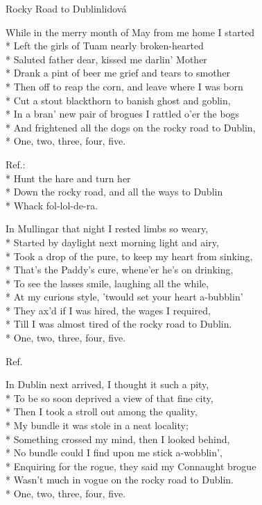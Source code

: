 \documentclass[10.5pt]{book}
\begin{document}
\iffalse
\begin{poem}{Rocky Road to Dublin}{lidová}

\settowidth{\versewidth}{And I have frightened all the dogs on the rocky road
to Dublin,}

While in the merry month of May from me home I started\\*
Left the girls of Tuam nearly broken-hearted\\*
Saluted father dear, kissed me darlin' Mother\\*
Drank a pint of beer me grief and tears to smother\\*
Then off to reap the corn, and leave where I was born\\*
Cut a stout blackthorn to banish ghost and goblin,\\*
In a bran' new pair of brogues I rattled o'er the bogs\\*
And frightened all the dogs on the rocky road to Dublin,\\*
One, two, three, four, five. 

Ref.:\\*
Hunt the hare and turn her\\*
Down the rocky road, and all the ways to Dublin\\*
Whack fol-lol-de-ra.

In Mullingar that night I rested limbs so weary,\\*
Started by daylight next morning light and airy,\\*
Took a drop of the pure, to keep my heart from \mbox{sinking},\\*
That's the Paddy's cure, whene'er he's on drinking,\\*
To see the lasses smile, laughing all the while,\\*
At my curious style, 'twould set your heart a-bubblin'\\*
They ax'd if I was hired, the wages I required,\\*
Till I was almost tired of the rocky road to Dublin.\\*
One, two, three, four, five. 

Ref.

In Dublin next arrived, I thought it such a pity,\\*
To be so soon deprived a view of that fine city,\\*
Then I took a stroll out among the quality,\\*
My bundle it was stole in a neat locality;\\*
Something crossed my mind, then I looked behind,\\*
No bundle could I find upon me stick a-wobblin',\\*
Enquiring for the rogue, they said my Connaught brogue\\*
Wasn't much in vogue on the rocky road to Dublin.\\*
One, two, three, four, five. 


\end{poem}
\end{document}

